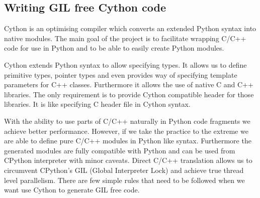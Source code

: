 \documentclass[12pt, a4paper]{report}
\begin{document}
\begin{appendices}
\chapter{Writing GIL free Cython code}\label{appen-ch:gil-free-cython-rules}
Cython is an optimising compiler which converts an extended Python syntax
into native modules. The main goal of the project is to facilitate
wrapping C/C++ code for use in Python and to be able to easily create
Python modules.

Cython extends Python syntax to allow specifying types. It allows
us to define primitive types, pointer types and even provides
way of specifying template parameters for C++ classes. Furthermore
it allows the use of native C and C++ libraries. The only requirement
is to provide Cython compatible header for those libraries. It
is like specifying C header file in Cython syntax.

With the ability to use parts of C/C++ naturally in Python code fragments
we achieve better performance. However, if we take the practice to the
extreme we are able to define pure C/C++ modules in Python like syntax.
Furthermore the generated modules are fully compatible with Python and
can be used from CPython interpreter with minor caveats. Direct C/C++
translation allows us to circumvent CPython's GIL (Global Interpreter Lock)
and achieve true thread level parallelism. There are few simple rules
that need to be followed when we want use Cython to generate GIL free code.


\end{appendices}
\end{document}
